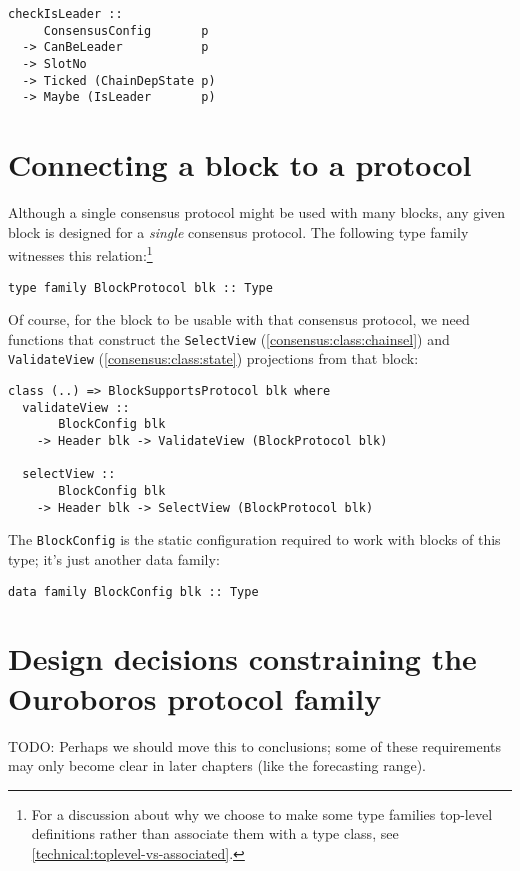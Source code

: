 \begin{lstlisting}
checkIsLeader ::
     ConsensusConfig       p
  -> CanBeLeader           p
  -> SlotNo
  -> Ticked (ChainDepState p)
  -> Maybe (IsLeader       p)
\end{lstlisting}

\section{Connecting a block to a protocol}
\label{BlockSupportsProtocol}

Although a single consensus protocol might be used with many blocks, any given
block is designed for a \emph{single} consensus protocol. The following type
family witnesses this relation:\footnote{For a discussion about why we
choose to make some type families top-level definitions rather than associate
them with a type class, see \cref{technical:toplevel-vs-associated}.}
%
\begin{lstlisting}
type family BlockProtocol blk :: Type
\end{lstlisting}
%
Of course, for the block to be usable with that consensus protocol, we need
functions that construct the \lstinline!SelectView!
(\cref{consensus:class:chainsel}) and \lstinline!ValidateView!
(\cref{consensus:class:state}) projections from that block:
%
\begin{lstlisting}
class (..) => BlockSupportsProtocol blk where
  validateView ::
       BlockConfig blk
    -> Header blk -> ValidateView (BlockProtocol blk)

  selectView ::
       BlockConfig blk
    -> Header blk -> SelectView (BlockProtocol blk)
\end{lstlisting}
The \lstinline!BlockConfig! is the static configuration required to work with
blocks of this type; it's just another data family:
%
\begin{lstlisting}
data family BlockConfig blk :: Type
\end{lstlisting}

\section{Design decisions constraining the Ouroboros protocol family}
\label{design-decisions-constraining-ouroboros}

 TODO: Perhaps we should move this to conclusions; some of these
requirements may only become clear in later chapters (like the forecasting
range).

